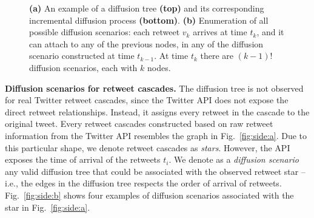 \begin{figure*}[tbp]
	\caption{
		\textbf{(a)} An example of a diffusion tree \textbf{(top)} and its corresponding incremental diffusion process \textbf{(bottom)}.
		\textbf{(b)} Enumeration of all possible diffusion scenarios: 
		each retweet $v_k$ arrives at time $t_k$, and it can attach to any of the previous nodes, in any of the diffusion scenario constructed at time $t_{k-1}$.
		At time $t_k$ there are $(k-1)!$ diffusion scenarios, each with $k$ nodes.
	}
\end{figure*}

\textbf{Diffusion scenarios for retweet cascades.}
The diffusion tree is not observed for real Twitter retweet cascades, since the Twitter API does not expose the direct retweet relationships.
Instead, it assigns every retweet in the cascade to the original tweet.
%
Every retweet cascades constructed based on raw retweet information from the Twitter API resembles the graph in Fig.~\ref{fig:side:a}.
Due to this particular shape, we denote retweet cascades as \emph{stars}.
However, the API exposes the time of arrival of the retweets $t_i$.
We denote as a \emph{diffusion scenario} any valid diffusion tree that could be associated with the observed retweet star -- i.e., the edges in the diffusion tree respects the order of arrival of retweets.
%
Fig.~\ref{fig:side:b} shows four examples of diffusion scenarios associated with the star in Fig.~\ref{fig:side:a}.

